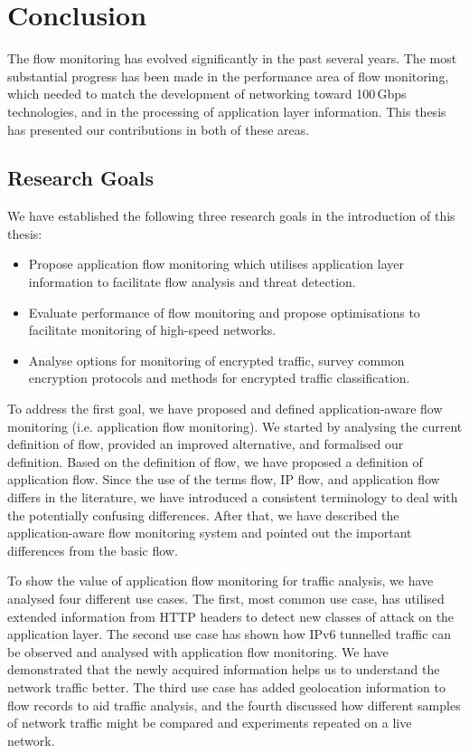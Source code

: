 \chapter{Conclusion}\label{chap:conclusions}

The flow monitoring has evolved significantly in the past several years. The most substantial progress has been made in the performance area of flow monitoring, which needed to match the development of networking toward 100\,Gbps technologies, and in the processing of application layer information. This thesis has presented our contributions in both of these areas. 

\section{Research Goals}

We have established the following three research goals in the introduction of this thesis:
\begin{itemize}
  \item Propose application flow monitoring which utilises application layer information to facilitate flow analysis and threat detection.
  \item Evaluate performance of flow monitoring and propose optimisations to facilitate monitoring of high-speed networks.
  \item Analyse options for monitoring of encrypted traffic, survey common encryption protocols and methods for encrypted traffic classification.
\end{itemize}

To address the first goal, we have proposed and defined application-aware flow monitoring (i.e. application flow monitoring). We started by analysing the current definition of flow, provided an improved alternative, and formalised our definition. Based on the definition of flow, we have proposed a definition of application flow. Since the use of the terms flow, IP flow, and application flow differs in the literature, we have introduced a consistent terminology to deal with the potentially confusing differences. After that, we have described the application-aware flow monitoring system and pointed out the important differences from the basic flow. 

To show the value of application flow monitoring for traffic analysis, we have analysed four different use cases. The first, most common use case, has utilised extended information from HTTP headers to detect new classes of attack on the application layer. The second use case has shown how IPv6 tunnelled traffic can be observed and analysed with application flow monitoring. We have demonstrated that the newly acquired information helps us to understand the network traffic better. The third use case has added geolocation information to flow records to aid traffic analysis, and the fourth discussed how different samples of network traffic might be compared and experiments repeated on a live network.

